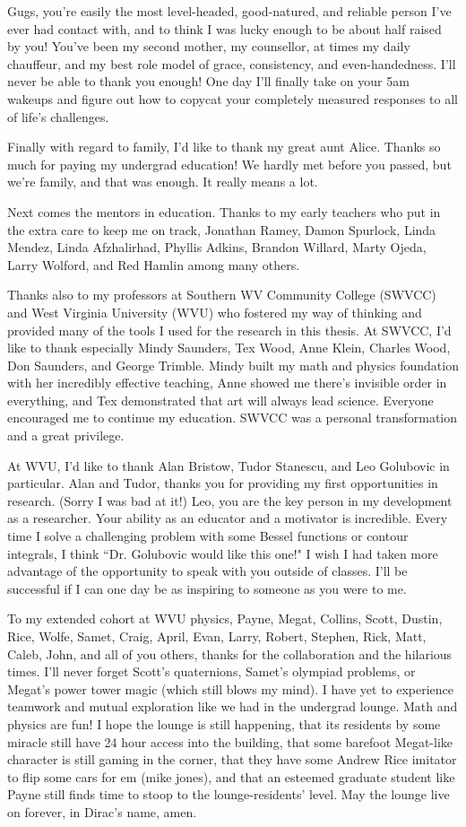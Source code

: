 Gugs, you're easily the most level-headed, good-natured, and reliable person I've ever had contact with, and to think I was lucky enough to be about half raised by you! You've been my second mother, my counsellor, at times my daily chauffeur, and my best role model of grace, consistency, and even-handedness. I'll never be able to thank you enough! One day I'll finally take on your 5am wakeups and figure out how to copycat your completely measured responses to all of life's challenges.

Finally with regard to family, I'd like to thank my great aunt Alice. Thanks so much for paying my undergrad education! We hardly met before you passed, but we're family, and that was enough. It really means a lot.

Next comes the mentors in education. Thanks to my early teachers who put in the extra care to keep me on track, Jonathan Ramey, Damon Spurlock, Linda Mendez, Linda Afzhalirhad, Phyllis Adkins, Brandon Willard, Marty Ojeda, Larry Wolford, and Red Hamlin among many others.
	
Thanks also to my professors at Southern WV Community College (SWVCC) and West Virginia University (WVU) who fostered my way of thinking and provided many of the tools I used for the research in this thesis.
At SWVCC, I'd like to thank especially Mindy Saunders, Tex Wood, Anne Klein, Charles Wood, Don Saunders, and George Trimble. Mindy built my math and physics foundation with her incredibly effective teaching, Anne showed me there's invisible order in everything, and Tex demonstrated that art will always lead science. Everyone encouraged me to continue my education. SWVCC was a personal transformation and a great privilege. 

At WVU, I'd like to thank Alan Bristow, Tudor Stanescu, and Leo Golubovic in particular. Alan and Tudor, thanks you for providing my first opportunities in research. (Sorry I was bad at it!) Leo, you are the key person in my development as a researcher. Your ability as an educator and a motivator is incredible. Every time I solve a challenging problem with some Bessel functions or contour integrals, I think ``Dr. Golubovic would like this one!" I wish I had taken more advantage of the opportunity to speak with you outside of classes. I'll be successful if I can one day be as inspiring to someone as you were to me.

To my extended cohort at WVU physics, Payne, Megat, Collins, Scott, Dustin, Rice, Wolfe, Samet, Craig, April, Evan, Larry, Robert, Stephen, Rick, Matt, Caleb, John, and all of you others, thanks for the collaboration and the hilarious times. I'll never forget Scott's quaternions, Samet's olympiad problems, or Megat's power tower magic (which still blows my mind). I have yet to experience teamwork and mutual exploration like we had in the undergrad lounge. Math and physics are fun! I hope the lounge is still happening, that its residents by some miracle still have 24 hour access into the building, that some barefoot Megat-like character is still gaming in the corner, that they have some Andrew Rice imitator to flip some cars for em (mike jones), and that an esteemed graduate student like Payne still finds time to stoop to the lounge-residents' level. May the lounge live on forever, in Dirac's name, amen.

